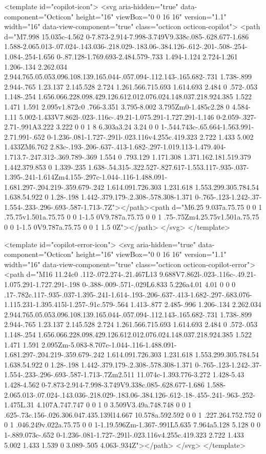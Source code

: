 <template id="copilot-icon">
  <svg aria-hidden="true" data-component="Octicon" height="16" viewBox="0 0 16 16" version="1.1" width="16" data-view-component="true" class="octicon octicon-copilot">
    <path d="M7.998 15.035c-4.562 0-7.873-2.914-7.998-3.749V9.338c.085-.628.677-1.686 1.588-2.065.013-.07.024-.143.036-.218.029-.183.06-.384.126-.612-.201-.508-.254-1.084-.254-1.656 0-.87.128-1.769.693-2.484.579-.733 1.494-1.124 2.724-1.261 1.206-.134 2.262.034 2.944.765.05.053.096.108.139.165.044-.057.094-.112.143-.165.682-.731 1.738-.899 2.944-.765 1.23.137 2.145.528 2.724 1.261.566.715.693 1.614.693 2.484 0 .572-.053 1.148-.254 1.656.066.228.098.429.126.612.012.076.024.148.037.218.924.385 1.522 1.471 1.591 2.095v1.872c0 .766-3.351 3.795-8.002 3.795Zm0-1.485c2.28 0 4.584-1.11 5.002-1.433V7.862l-.023-.116c-.49.21-1.075.291-1.727.291-1.146 0-2.059-.327-2.71-.991A3.222 3.222 0 0 1 8 6.303a3.24 3.24 0 0 1-.544.743c-.65.664-1.563.991-2.71.991-.652 0-1.236-.081-1.727-.291l-.023.116v4.255c.419.323 2.722 1.433 5.002 1.433ZM6.762 2.83c-.193-.206-.637-.413-1.682-.297-1.019.113-1.479.404-1.713.7-.247.312-.369.789-.369 1.554 0 .793.129 1.171.308 1.371.162.181.519.379 1.442.379.853 0 1.339-.235 1.638-.54.315-.322.527-.827.617-1.553.117-.935-.037-1.395-.241-1.614Zm4.155-.297c-1.044-.116-1.488.091-1.681.297-.204.219-.359.679-.242 1.614.091.726.303 1.231.618 1.553.299.305.784.54 1.638.54.922 0 1.28-.198 1.442-.379.179-.2.308-.578.308-1.371 0-.765-.123-1.242-.37-1.554-.233-.296-.693-.587-1.713-.7Z"></path><path d="M6.25 9.037a.75.75 0 0 1 .75.75v1.501a.75.75 0 0 1-1.5 0V9.787a.75.75 0 0 1 .75-.75Zm4.25.75v1.501a.75.75 0 0 1-1.5 0V9.787a.75.75 0 0 1 1.5 0Z"></path>
</svg>
</template>

<template id="copilot-error-icon">
  <svg aria-hidden="true" data-component="Octicon" height="16" viewBox="0 0 16 16" version="1.1" width="16" data-view-component="true" class="octicon octicon-copilot-error">
    <path d="M16 11.24c0 .112-.072.274-.21.467L13 9.688V7.862l-.023-.116c-.49.21-1.075.291-1.727.291-.198 0-.388-.009-.571-.029L6.833 5.226a4.01 4.01 0 0 0 .17-.782c.117-.935-.037-1.395-.241-1.614-.193-.206-.637-.413-1.682-.297-.683.076-1.115.231-1.395.415l-1.257-.91c.579-.564 1.413-.877 2.485-.996 1.206-.134 2.262.034 2.944.765.05.053.096.108.139.165.044-.057.094-.112.143-.165.682-.731 1.738-.899 2.944-.765 1.23.137 2.145.528 2.724 1.261.566.715.693 1.614.693 2.484 0 .572-.053 1.148-.254 1.656.066.228.098.429.126.612.012.076.024.148.037.218.924.385 1.522 1.471 1.591 2.095Zm-5.083-8.707c-1.044-.116-1.488.091-1.681.297-.204.219-.359.679-.242 1.614.091.726.303 1.231.618 1.553.299.305.784.54 1.638.54.922 0 1.28-.198 1.442-.379.179-.2.308-.578.308-1.371 0-.765-.123-1.242-.37-1.554-.233-.296-.693-.587-1.713-.7Zm2.511 11.074c-1.393.776-3.272 1.428-5.43 1.428-4.562 0-7.873-2.914-7.998-3.749V9.338c.085-.628.677-1.686 1.588-2.065.013-.07.024-.143.036-.218.029-.183.06-.384.126-.612-.18-.455-.241-.963-.252-1.475L.31 4.107A.747.747 0 0 1 0 3.509V3.49a.748.748 0 0 1 .625-.73c.156-.026.306.047.435.139l14.667 10.578a.592.592 0 0 1 .227.264.752.752 0 0 1 .046.249v.022a.75.75 0 0 1-1.19.596Zm-1.367-.991L5.635 7.964a5.128 5.128 0 0 1-.889.073c-.652 0-1.236-.081-1.727-.291l-.023.116v4.255c.419.323 2.722 1.433 5.002 1.433 1.539 0 3.089-.505 4.063-.934Z"></path>
</svg>
</template>

